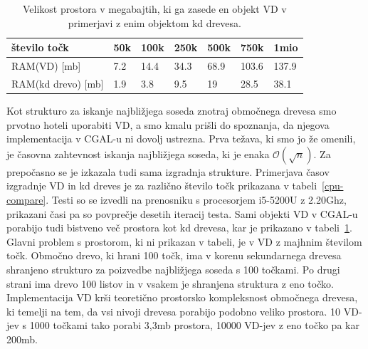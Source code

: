 \documentclass[a4paper, 12pt]{book}
\newcommand{\OO}{\ensuremath{\mathcal{O}}} %
\begin{document}
\begin{table}
\begin{center}
\begin{tabular}{l|l|l|l|l|l|l}
število točk & 50k & 100k & 250k & 500k & 750k & 1mio \\ \hline \hline
RAM(VD) [mb] & 7.2 & 14.4 & 34.3 & 68.9 & 103.6 & 137.9 \\ \hline
RAM(kd drevo) [mb] & 1.9 & 3.8 & 9.5 & 19 & 28.5 & 38.1
\end{tabular}
\caption{Velikost prostora v megabajtih, ki ga zasede en objekt VD v primerjavi z enim objektom kd drevesa.}
\label{ram_compare}
\end{center}
\end{table}

Kot strukturo za iskanje najbližjega soseda znotraj območnega drevesa smo prvotno hoteli uporabiti VD, a smo kmalu prišli do spoznanja, da njegova implementacija v CGAL-u ni dovolj ustrezna. Prva težava, ki smo jo že omenili, je časovna zahtevnost iskanja najbližjega soseda, ki je enaka $\OO(\sqrt{n})$. Za prepočasno se je izkazala tudi sama izgradnja strukture. Primerjava časov izgradnje VD in kd dreves je za različno število točk prikazana v tabeli~\ref{cpu-compare}. Testi so se izvedli na prenosniku s procesorjem i5-5200U z 2.20Ghz, prikazani časi pa so povprečje desetih iteracij testa. Sami objekti VD v CGAL-u porabijo tudi bistveno več prostora kot kd drevesa, kar je prikazano v tabeli~\ref{ram_compare}. Glavni problem s prostorom, ki ni prikazan v tabeli, je v VD z majhnim številom točk. Območno drevo, ki hrani 100 točk, ima v korenu sekundarnega drevesa shranjeno strukturo za poizvedbe najbližjega soseda s 100 točkami. Po drugi strani ima drevo 100 listov in v vsakem je shranjena struktura z eno točko. Implementacija VD krši teoretično prostorsko kompleksnost območnega drevesa, ki temelji na tem, da vsi nivoji drevesa porabijo podobno veliko prostora. 10 VD-jev s 1000 točkami tako porabi 3,3mb prostora, 10000 VD-jev z eno točko pa kar 200mb.  
\end{document}
